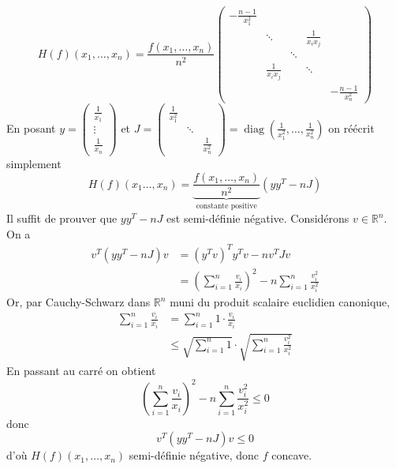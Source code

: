 \documentclass{report}
\DeclareMathOperator{\diag}{diag}
\begin{document}
\[
   H(f)(x_1,\ldots,x_n) = \frac{f(x_1,\ldots, x_n)}{n^2} \left(
    \begin{array}{ccccc}
    -\frac{n-1}{x_1^2}                                    \\
      & \ddots             &   & \frac{1}{x_i x_j}\\
      &               & \ddots                \\
      & \frac{1}{x_i x_j} &   & \ddots            \\
      &               &   &   & -\frac{n-1}{x_n^2}
    \end{array}
    \right)
\]  
En posant $y=\begin{pmatrix}
\frac 1{x_1}\\
\vdots\\
\frac 1{x_n}
\end{pmatrix}$ et $J=\begin{pmatrix}
\frac 1{x_1^2} \\
& \ddots \\
&& \frac 1{x_n^2}
\end{pmatrix}=\diag(\frac 1{x_1^2},\ldots,\frac 1{x_n^2})$ \newline
on réécrit simplement $$H(f)(x_1\ldots,x_n)=\underbrace{\frac{f(x_1,\ldots, x_n)}{n^2}}_{\text{constante positive}}(yy^T-nJ)$$
Il suffit de prouver que $yy^T-nJ$ est semi-définie négative. Considérons $v\in \mathbb R^n$.
On a $$\begin{aligned}
v^T(yy^T-nJ)v &= (y^Tv)^Ty^Tv-nv^TJv\\
&= \left(\sum_{i=1}^n \frac{v_i}{x_i}\right)^2 - n \sum_{i=1}^n \frac{v_i^2}{x_i^2}
\end{aligned}$$
Or, par Cauchy-Schwarz dans $\mathbb R^n$ muni du produit scalaire euclidien canonique,
$$\begin{aligned} \sum_{i=1}^n \frac{v_i}{x_i} &= \sum_{i=1}^n 1\cdot \frac{v_i}{x_i}\\
&\leq \sqrt{\sum_{i=1}^n 1} \cdot \sqrt{\sum_{i=1}^n \frac{v_i^2}{x_i^2}}
\end{aligned}$$
En passant au carré on obtient $$\left(\sum_{i=1}^n \frac{v_i}{x_i}\right)^2 - n \sum_{i=1}^n \frac{v_i^2}{x_i^2}\leq 0$$ donc $$v^T(yy^T-nJ)v\leq 0$$ d'où $H(f)(x_1,\ldots,x_n)$ semi-définie négative, donc $f$ concave.
\end{document}
